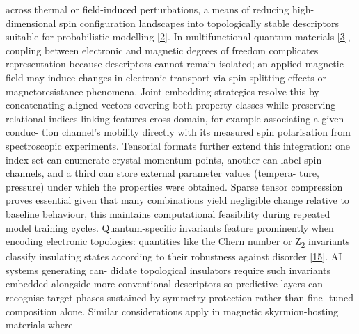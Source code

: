 \documentclass[
]{article}
\begin{document}
across thermal or field-induced perturbations, a means of reducing
high-dimensional spin configuration landscapes into topologically stable
descriptors suitable for probabilistic modelling
{[}\protect\hyperlink{_bookmark42}{2}{]}. In multifunctional quantum
materials {[}\protect\hyperlink{_bookmark43}{3}{]}, coupling between
electronic and magnetic degrees of freedom complicates representation
because descriptors cannot remain isolated; an applied magnetic field
may induce changes in electronic transport via spin-splitting effects or
magnetoresistance phenomena. Joint embedding strategies resolve this by
concatenating aligned vectors covering both property classes while
preserving relational indices linking features cross-domain, for example
associating a given conduc- tion channel's mobility directly with its
measured spin polarisation from spectroscopic experiments. Tensorial
formats further extend this integration: one index set can enumerate
crystal momentum points, another can label spin channels, and a third
can store external parameter values (tempera- ture, pressure) under
which the properties were obtained. Sparse tensor compression proves
essential given that many combinations yield negligible change relative
to baseline behaviour, this maintains computational feasibility during
repeated model training cycles. Quantum-specific invariants feature
prominently when encoding electronic topologies: quantities like the
Chern number or Z\textsubscript{2} invariants classify insulating states
according to their robustness against disorder
{[}\protect\hyperlink{_bookmark55}{15}{]}. AI systems generating can-
didate topological insulators require such invariants embedded alongside
more conventional descriptors so predictive layers can recognise target
phases sustained by symmetry protection rather than fine- tuned
composition alone. Similar considerations apply in magnetic
skyrmion-hosting materials where
\end{document}
